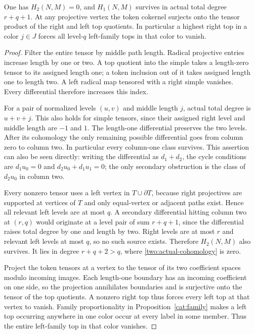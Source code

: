 \begin{lemma}
\label{two:tensor}
One has $H_2(N,M)=0$, and $H_1(N,M)$ survives in actual total
degree $r+q+1$.  At any projective vertex the token cokernel
surjects onto the tensor product of the right and left top quotients.
In particular a highest right top in a color $j\in J$ forces all
level-$q$ left-family tops in that color to vanish.
\end{lemma}
\begin{proof}
Filter the entire tensor by middle path length.  Radical projective
entries increase length by one or two.  A top quotient into the
simple takes a length-zero tensor to its assigned length one;
a token inclusion out of it takes assigned length one to length
two.  A left radical map tensored with a right simple vanishes.
Every differential therefore increases this index.

For a pair of normalized levels $(u,v)$ and middle length $j$,
actual total degree is $u+v+j$.  This also holds for simple tensors,
since their assigned right level and middle length are $-1$ and
$1$.  The length-one differential preserves the two levels.
After its cohomology the only remaining possible differential goes
from column zero to column two.  In particular every column-one
class survives.  This assertion can also be seen directly: writing
the differential as $d_1+d_2$, the cycle conditions are
$d_1u_0=0$ and $d_2u_0+d_1u_1=0$; the only secondary obstruction
is the class of $d_2u_0$ in column two.

Every nonzero tensor uses a left vertex in $T\cup\partial T$,
because right projectives are supported at vertices of $T$ and
only equal-vertex or adjacent paths exist.  Hence all relevant
left levels are at most $q$.  A secondary differential hitting
column two at $(r,q)$ would originate at a level pair of sum
$r+q+1$, since the differential raises total degree by one and
length by two.  Right levels are at most $r$ and relevant left
levels at most $q$, so no such source exists.  Therefore $H_2(N,M)$
also survives.  It lies in degree $r+q+2>q$, where
\eqref{two:actual-cohomology} is zero.

Project the token tensors at a vertex to the tensor of its two
coefficient spaces modulo incoming images.  Each length-one
boundary has an incoming coefficient on one side, so the projection
annihilates boundaries and is surjective onto the tensor of the top
quotients.  A nonzero right top thus forces every left top at that
vertex to vanish.  Family proportionality in
Proposition~\ref{cat:family} makes a left top occurring anywhere in
one color occur at every label in some member.  Thus the entire
left-family top in that color vanishes.
\end{proof}

